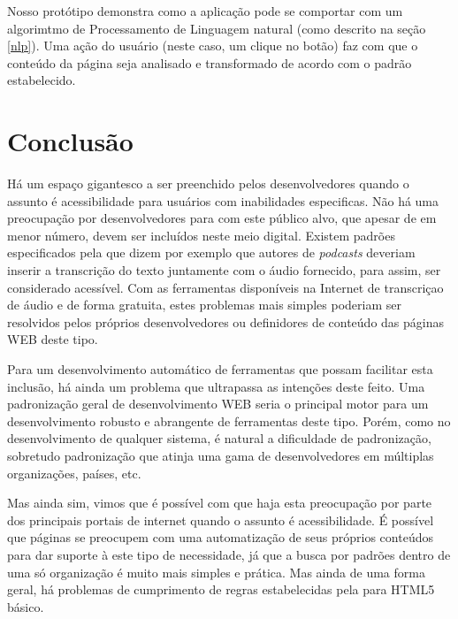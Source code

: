\documentclass[
	12pt,				%
	oneside,			%
	a4paper,			%
	english,			%
	brazil				%
	]{abntex2ppgsi}
\begin{document}
Nosso protótipo demonstra como a aplicação pode se comportar com um algorimtmo de Processamento de Linguagem natural (como descrito na seção \ref{nlp}). Uma ação do usuário (neste caso, um clique no botão) faz com que o conteúdo da página seja analisado e transformado de acordo com o padrão estabelecido.

\chapter{Conclusão}

Há um espaço gigantesco a ser preenchido pelos desenvolvedores quando o assunto é acessibilidade para usuários com inabilidades especificas. Não há uma preocupação por desenvolvedores para com este público alvo, que apesar de em menor número, devem ser incluídos neste meio digital. Existem padrões especificados pela  que dizem por exemplo que autores de \textit{podcasts} deveriam inserir a transcrição do texto juntamente com o áudio fornecido, para assim, ser considerado acessível. Com as ferramentas disponíveis na Internet de transcriçao de áudio e de forma gratuita, estes problemas mais simples poderiam ser resolvidos pelos próprios desenvolvedores ou definidores de conteúdo das páginas WEB deste tipo.

Para um desenvolvimento automático de ferramentas que possam facilitar esta inclusão, há ainda um problema que ultrapassa as intenções deste feito. Uma padronização geral de desenvolvimento WEB seria o principal motor para um desenvolvimento robusto e abrangente de ferramentas deste tipo. Porém, como no desenvolvimento de qualquer sistema, é natural a dificuldade de padronização, sobretudo padronização que atinja uma gama de desenvolvedores em múltiplas organizações, países, etc. 

Mas ainda sim, vimos que é possível com que haja esta preocupação por parte dos principais portais de internet quando o assunto é acessibilidade. É possível que páginas se preocupem com uma automatização de seus próprios conteúdos para dar suporte à este tipo de necessidade, já que a busca por padrões dentro de uma só organização é muito mais simples e prática. Mas ainda de uma forma geral, há problemas de cumprimento de regras estabelecidas pela  para HTML5 básico. 


\postextual




\end{document}
